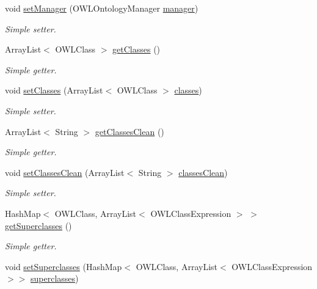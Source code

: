 \begin{DoxyCompactItemize}
void \hyperlink{class_ontology_1_1_ontology_a802994698b3a28c8ad6e31f2c02299cf}{setManager} (OWLOntologyManager \hyperlink{class_ontology_1_1_ontology_a23f7c60be021e9813bc3b004166b12d1}{manager})
\begin{DoxyCompactList}\small\item\em Simple setter. \end{DoxyCompactList}\item 
ArrayList$<$ OWLClass $>$ \hyperlink{class_ontology_1_1_ontology_a02dbe350e5c6c59c8a27dff7f3a643d7}{getClasses} ()
\begin{DoxyCompactList}\small\item\em Simple getter. \end{DoxyCompactList}\item 
void \hyperlink{class_ontology_1_1_ontology_ab9d088ebcfd87b648bacd0053f402158}{setClasses} (ArrayList$<$ OWLClass $>$ \hyperlink{class_ontology_1_1_ontology_a60484a66d42244f83c944d7fd7f67fcf}{classes})
\begin{DoxyCompactList}\small\item\em Simple setter. \end{DoxyCompactList}\item 
ArrayList$<$ String $>$ \hyperlink{class_ontology_1_1_ontology_a1cad18775a94610a7c563dfcdbfe7ab5}{getClassesClean} ()
\begin{DoxyCompactList}\small\item\em Simple getter. \end{DoxyCompactList}\item 
void \hyperlink{class_ontology_1_1_ontology_ab2984f2e5d7012029fd6d98d1447433a}{setClassesClean} (ArrayList$<$ String $>$ \hyperlink{class_ontology_1_1_ontology_a35b7af950c4bd1f698fcf18cb38f4e02}{classesClean})
\begin{DoxyCompactList}\small\item\em Simple setter. \end{DoxyCompactList}\item 
HashMap$<$ OWLClass, ArrayList$<$ OWLClassExpression $>$ $>$ \hyperlink{class_ontology_1_1_ontology_a1e791e04e11967cadc062b5c23344980}{getSuperclasses} ()
\begin{DoxyCompactList}\small\item\em Simple getter. \end{DoxyCompactList}\item 
void \hyperlink{class_ontology_1_1_ontology_a54171d4f7b19e9743391140af5a328af}{setSuperclasses} (HashMap$<$ OWLClass, ArrayList$<$ OWLClassExpression $>$$>$ \hyperlink{class_ontology_1_1_ontology_a0a5224da294ff4af352081031305f799}{superclasses})
$$
\end{DoxyCompactItemize}
